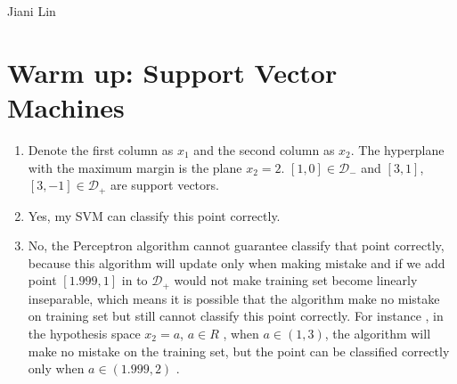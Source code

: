 \documentclass[12pt, fullpage,letterpaper]{article}
\begin{document}
\begin{center}
Jiani Lin
\end{center}
\section{Warm up: Support Vector Machines}
\begin{enumerate}
\item Denote the first column as $x_1$ and the second column as $x_2$. The hyperplane with the maximum margin is the plane $x_2=2$. $[1, 0]\in \mathcal{D}_-$ and $[3, 1]$, $[3,-1] \in  \mathcal{D}_+$ are support vectors.
\item Yes, my SVM can classify this point correctly.
\item No, the Perceptron algorithm cannot guarantee classify that point correctly, because this algorithm will update only when making mistake and if we add point $[1.999, 1]$ in to $\mathcal{D}_+ $ would not make training set become  linearly inseparable, which means it is possible that the algorithm make no mistake on training set but still cannot classify this point correctly. For instance , in the hypothesis space $x_2=a$, $a \in R$ , when $a \in (1,3)$, the algorithm will make no mistake on the training set, but the point can be classified  correctly only when $a \in (1.999,2)$ .
\end{enumerate}
\end{document}

